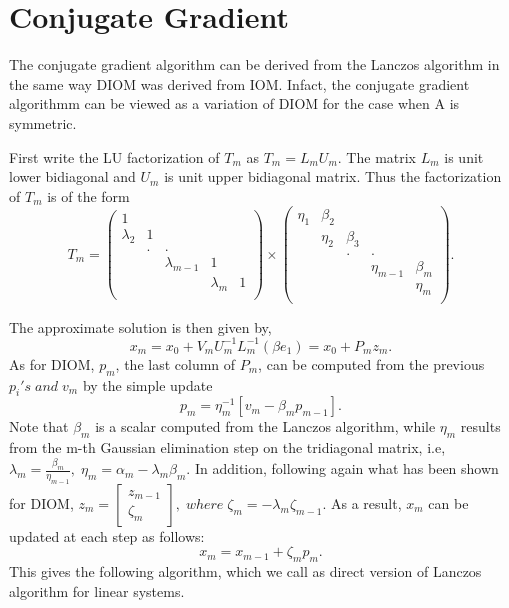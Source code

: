\documentclass[10pt,a4paper]{article}
\begin{document}
\section{Conjugate Gradient}

The conjugate gradient algorithm can be derived from the Lanczos algorithm in the same way DIOM was derived from IOM. Infact, the conjugate gradient algorithmm can be viewed as a variation of DIOM for the case when A is symmetric.

First write the LU factorization of $T_m$ as $T_m=L_mU_m.$ The matrix $L_m$ is unit lower bidiagonal and $U_m$ is unit upper bidiagonal matrix. Thus the factorization of $T_m$ is of the form
$$
T_m = 
\left( \begin{array}{ccccc}
1 &  &  &  &  \\
\lambda_2 & 1 &  &  &  \\
 & . & . &  &  \\
 &  & \lambda_{m-1} & 1 &  \\
 &  &  & \lambda_m & 1 \\
\end{array} \right)\times 
\left( \begin{array}{ccccc}
\eta_1 & \beta_2 &  &  &  \\
 & \eta_2 & \beta_3 &  &  \\
 &  & . & . &  \\
 &  &  & \eta_{m-1} & \beta_m \\
 &  &  &  & \eta_m \\
\end{array} \right).
$$

The approximate solution is then given by,
$$x_m=x_0+V_mU^{-1}_mL^{-1}_m(\beta e_1) = x_0+P_mz_m.$$
As for DIOM, $p_m$, the last column of $P_m$, can be computed from the previous $p_i's\;and\;v_m$ by the simple update
$$p_m=\eta^{-1}_m[v_m-\beta_mp_{m-1}].$$
Note that $\beta_m$ is a scalar computed from the Lanczos algorithm, while $\eta_m$ results from the m-th Gaussian elimination step on the tridiagonal matrix, i.e, $\lambda_m=\frac{\beta_m}{\eta_{m-1}},\;\eta_m=\alpha_m-\lambda_m\beta_m.$ In addition, following again what has been shown for DIOM, $z_m=\left[ \begin{array}{c} z_{m-1} \\ \zeta_m \end{array} \right],\;where\;\zeta_m=-\lambda_m\zeta_{m-1}.$
As a result, $x_m$ can be updated at each step as follows:
$$x_m=x_{m-1}+\zeta_mp_m.$$
This gives the following algorithm, which we call as direct version of Lanczos algorithm for linear systems.
\end{document}
